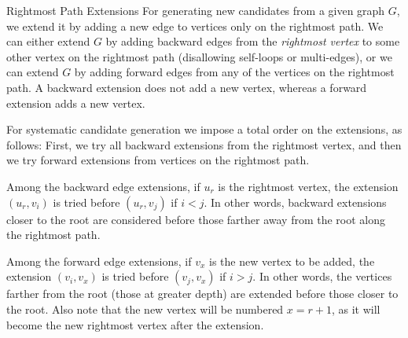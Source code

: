 \begin{frame}[fragile]{Rightmost Path Extensions}
  \small
For generating new candidates from a given graph $G$, we extend it
by adding a new edge to vertices only on the rightmost path.  We can
either extend $G$ by adding backward edges from the {\em rightmost
vertex} to some other vertex on the rightmost path (disallowing
self-loops or multi-edges), or we can extend $G$ by adding forward edges
from any of the vertices on the rightmost path. A backward extension does
not add a new vertex, whereas a forward extension adds a new vertex.

\bigskip
For systematic candidate generation we impose a total order on the
extensions, as follows:
F{i}rst, we try all backward extensions from the rightmost
vertex, and then we try forward extensions from vertices on the
rightmost path.  

\medskip
Among the backward edge extensions, if $u_r$ is the
rightmost vertex, the extension $(u_r,v_i)$ is tried before $(u_r,v_{j})$
if $i < j$.  In other words, backward extensions closer to the root are
considered before those farther away from the root along the rightmost
path.  

\medskip
Among the forward edge extensions, if $v_x$ is the new vertex to
be added, the extension $(v_i,v_x)$ is tried before $(v_{j}, v_x)$ if $i >
j$. In other words, the vertices farther from the root (those at
greater depth) are extended
before those closer to the root. Also note that the new vertex will be
numbered $x=r+1$, as it will become the new rightmost vertex after
the extension.

\end{frame}


